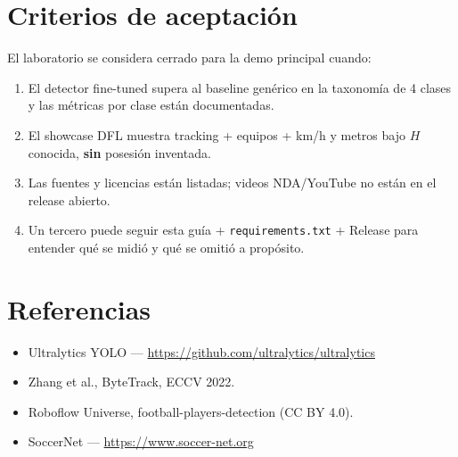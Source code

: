 \documentclass[11pt,a4paper]{article}
\begin{document}
\section{Criterios de aceptación}
\label{sec:aceptacion}

El laboratorio se considera cerrado para la demo principal cuando:

\begin{enumerate}[leftmargin=*,itemsep=3pt]
  \item El detector fine-tuned supera al baseline genérico en la taxonomía de 4 clases y las métricas por clase están documentadas.
  \item El showcase DFL muestra tracking + equipos + km/h y metros bajo $H$ conocida, \textbf{sin} posesión inventada.
  \item Las fuentes y licencias están listadas; videos NDA/YouTube no están en el release abierto.
  \item Un tercero puede seguir esta guía + \texttt{requirements.txt} + Release para entender qué se midió y qué se omitió a propósito.
\end{enumerate}

\section*{Referencias}
\begin{itemize}[leftmargin=*,itemsep=2pt]
  \item Ultralytics YOLO --- \url{https://github.com/ultralytics/ultralytics}
  \item Zhang et al., ByteTrack, ECCV 2022.
  \item Roboflow Universe, football-players-detection (CC BY 4.0).
  \item SoccerNet --- \url{https://www.soccer-net.org}
\end{itemize}
\end{document}
